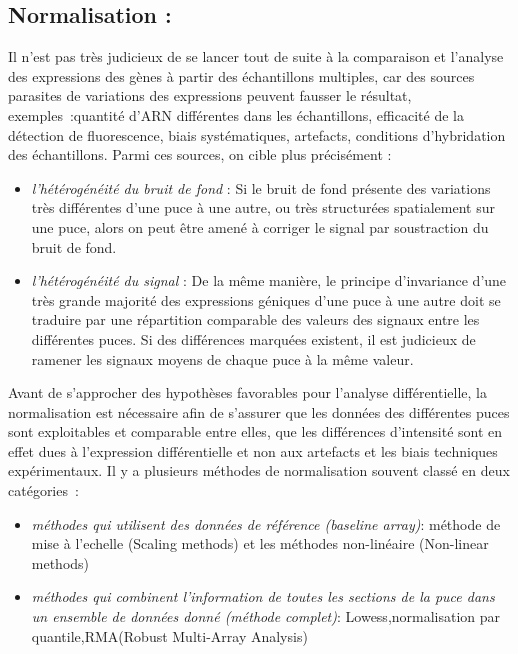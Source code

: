 \documentclass[a4paper,10pt]{article}
\begin{document}
\subsection{Normalisation :}
Il n’est pas très judicieux de se lancer tout de suite à la comparaison et l’analyse des expressions des gènes à partir des échantillons multiples, car des sources parasites de variations des expressions peuvent fausser le résultat, exemples :quantité d’ARN différentes dans les échantillons, efficacité de la détection 
de fluorescence, biais systématiques, artefacts, conditions d’hybridation des échantillons.
Parmi ces sources, on cible plus précisément :
\begin{itemize}
 \item \emph{l’hétérogénéité du bruit de fond} :
 Si le bruit de fond présente des variations très différentes d’une puce à une autre, ou très structurées spatialement sur une puce, alors on peut être amené à corriger le signal par soustraction du bruit de fond. 
 \item \emph{l’hétérogénéité du signal} :
 De la même manière, le principe d’invariance d’une très grande majorité des expressions géniques d’une puce à une autre doit se traduire par une répartition comparable des valeurs des signaux entre les différentes puces. Si des différences marquées existent, il est judicieux de ramener les signaux moyens de chaque puce à la même valeur.
\end{itemize}
Avant de s’approcher des hypothèses favorables pour l’analyse différentielle, la normalisation est nécessaire afin de s’assurer que les données des différentes puces sont exploitables et comparable entre elles, que les différences d’intensité sont en effet dues à l’expression différentielle et non aux artefacts et les biais techniques expérimentaux.
Il y a plusieurs méthodes de normalisation\cite{bolstad2003comparison} souvent classé en deux catégories :
\begin{itemize}
 \item \emph{méthodes qui utilisent des données de référence (baseline array)}: méthode de mise à l'echelle (Scaling methods) et les méthodes non-linéaire (Non-linear methods)
 \item \emph{méthodes qui combinent l’information de toutes les sections de la puce dans un ensemble de données donné (méthode complet)}: Lowess,normalisation par quantile,RMA(Robust Multi-Array Analysis)
\end{itemize}

\end{document}
